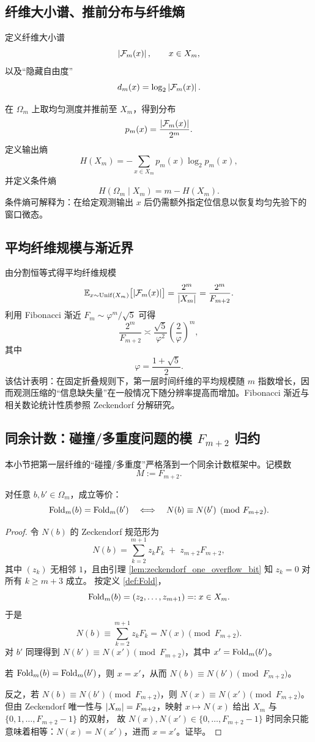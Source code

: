 \subsection{纤维大小谱、推前分布与纤维熵}

定义纤维大小谱
$$
\left\lvert \mathcal F_m(x)\right\rvert,\qquad x\in X_m,
$$
以及“隐藏自由度”
$$
d_m(x)=\log_2\left\lvert \mathcal F_m(x)\right\rvert.
$$

在 $\Omega_m$ 上取均匀测度并推前至 $X_m$，得到分布
$$
p_m(x)=\frac{\left\lvert \mathcal F_m(x)\right\rvert}{2^m}.
$$
定义输出熵
$$
H(X_m)=-\sum_{x\in X_m} p_m(x)\log_2 p_m(x),
$$
并定义条件熵
$$
H(\Omega_m\mid X_m)=m-H(X_m).
$$
条件熵可解释为：在给定观测输出 $x$ 后仍需额外指定位信息以恢复均匀先验下的窗口微态。

\subsection{平均纤维规模与渐近界}

由分割恒等式得平均纤维规模
$$
\mathbb E_{x\sim \mathrm{Unif}(X_m)}\bigl[\left\lvert \mathcal F_m(x)\right\rvert\bigr]
=\frac{2^m}{\left\lvert X_m\right\rvert}
=\frac{2^m}{F_{m+2}}.
$$
利用 Fibonacci 渐近 $F_m\sim \varphi^{m}/\sqrt 5$ 可得
$$
\frac{2^m}{F_{m+2}}
\asymp
\frac{\sqrt 5}{\varphi^2}\left(\frac{2}{\varphi}\right)^m,
$$
其中
$$
\varphi=\frac{1+\sqrt 5}{2}.
$$
该估计表明：在固定折叠规则下，第一层时间纤维的平均规模随 $m$ 指数增长，因而观测压缩的“信息缺失量”在一般情况下随分辨率提高而增加。Fibonacci 渐近与相关数论统计性质参照 Zeckendorf 分解研究。\cite{kkmw_zeckendorf_summands}

\subsection{同余计数：碰撞/多重度问题的模 \texorpdfstring{$F_{m+2}$}{F(m+2)} 归约}
\MathTag
本小节把第一层纤维的“碰撞/多重度”严格落到一个同余计数框架中。记模数
$$
M:=F_{m+2}.
$$

\begin{proposition}[同像 $\Leftrightarrow$ 同余]\label{prop:fold_congruence_characterization}
\MathTag
对任意 $b,b'\in\Omega_m$，成立等价：
$$
\mathrm{Fold}_m(b)=\mathrm{Fold}_m(b')
\quad\Longleftrightarrow\quad
N(b)\equiv N(b')\pmod{F_{m+2}}.
$$
\end{proposition}

\begin{proof}
\MathTag
令 $N(b)$ 的 Zeckendorf 规范形为
$$
N(b)=\sum_{k=2}^{m+1} z_k F_k\;+\;z_{m+2}F_{m+2},
$$
其中 $(z_k)$ 无相邻 $1$，且由引理 \ref{lem:zeckendorf_one_overflow_bit} 知 $z_k=0$ 对所有 $k\ge m+3$ 成立。
按定义 \ref{def:Fold}，
$$
\mathrm{Fold}_m(b)=(z_2,\dots,z_{m+1})=:x\in X_m.
$$
于是
$$
N(b)\equiv \sum_{k=2}^{m+1} z_k F_k = N(x)\pmod{F_{m+2}}.
$$
对 $b'$ 同理得到 $N(b')\equiv N(x')\pmod{F_{m+2}}$，其中 $x'=\mathrm{Fold}_m(b')$。

\smallskip
\noindent
若 $\mathrm{Fold}_m(b)=\mathrm{Fold}_m(b')$，则 $x=x'$，从而 $N(b)\equiv N(b')\pmod{F_{m+2}}$。

\smallskip
\noindent
反之，若 $N(b)\equiv N(b')\pmod{F_{m+2}}$，则 $N(x)\equiv N(x')\pmod{F_{m+2}}$。
但由 Zeckendorf 唯一性与 $\left\lvert X_m\right\rvert=F_{m+2}$，映射 $x\mapsto N(x)$ 给出 $X_m$ 与 $\{0,1,\dots,F_{m+2}-1\}$ 的双射，
故 $N(x),N(x')\in\{0,\dots,F_{m+2}-1\}$ 时同余只能意味着相等：$N(x)=N(x')$，进而 $x=x'$。证毕。
\end{proof}

